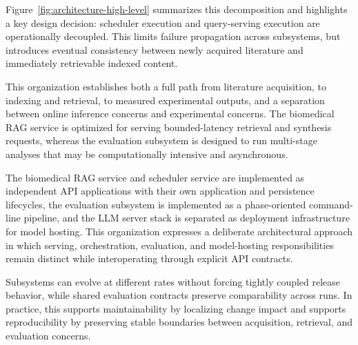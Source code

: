 Figure~\ref{fig:architecture-high-level} summarizes this decomposition and highlights a key design decision: scheduler execution and query-serving execution are operationally decoupled. This limits failure propagation across subsystems, but introduces eventual consistency between newly acquired literature and immediately retrievable indexed content.

This organization establishes both a full path from literature acquisition, to indexing and retrieval, to measured experimental outputs, and a separation between online inference concerns and experimental concerns. The biomedical RAG service is optimized for serving bounded-latency retrieval and synthesis requests, whereas the evaluation subsystem is designed to run multi-stage analyses that may be computationally intensive and asynchronous.

The biomedical RAG service and scheduler service are implemented as independent API applications with their own application and persistence lifecycles, the evaluation subsystem is implemented as a phase-oriented command-line pipeline, and the LLM server stack is separated as deployment infrastructure for model hosting. This organization expresses a deliberate architectural approach in which serving, orchestration, evaluation, and model-hosting responsibilities remain distinct while interoperating through explicit API contracts.

Subsystems can evolve at different rates without forcing tightly coupled release behavior, while shared evaluation contracts preserve comparability across runs. In practice, this supports maintainability by localizing change impact and supports reproducibility by preserving stable boundaries between acquisition, retrieval, and evaluation concerns.

\clearpage

